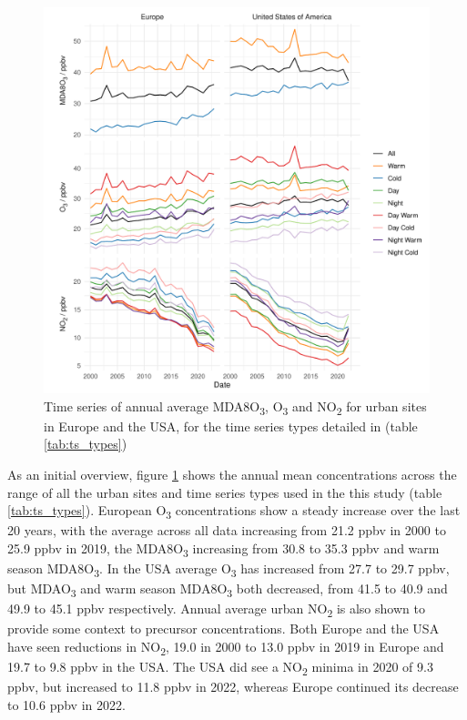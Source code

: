 \documentclass[journal abbreviation, manuscript]{copernicus}
\begin{document}
\begin{figure}[t]
\includegraphics[width=12cm]{figures/paper_figures/f2.pdf}
\caption{Time series of annual average MDA8O\textsubscript{3}, O\textsubscript{3} and NO\textsubscript{2} for urban sites in Europe and the USA, for the time series types detailed in (table \ref{tab:ts_types})}
\label{fig:conc_plot}
\end{figure}

As an initial overview, figure \ref{fig:conc_plot} shows the annual mean concentrations across the range of all the urban sites and time series types used in the this study (table \ref{tab:ts_types}). European O\textsubscript{3} concentrations show a steady increase over the last 20 years, with the average across all data increasing from 21.2 ppbv in 2000 to 25.9 ppbv in 2019, the MDA8O\textsubscript{3} increasing from 30.8 to 35.3 ppbv and warm season MDA8O\textsubscript{3}. In the USA average O\textsubscript{3} has increased from 27.7 to 29.7 ppbv, but MDAO\textsubscript{3} and warm season MDA8O\textsubscript{3} both decreased, from 41.5 to 40.9 and 49.9 to 45.1 ppbv respectively. Annual average urban NO\textsubscript{2} is also shown to provide some context to precursor concentrations. Both Europe and the USA have seen reductions in NO\textsubscript{2}, 19.0 in 2000 to 13.0 ppbv in 2019 in Europe and 19.7 to 9.8 ppbv in the USA. The USA did see a NO\textsubscript{2} minima in 2020 of 9.3 ppbv, but increased to 11.8 ppbv in 2022, whereas Europe continued its decrease to 10.6 ppbv in 2022. 
\end{document}
